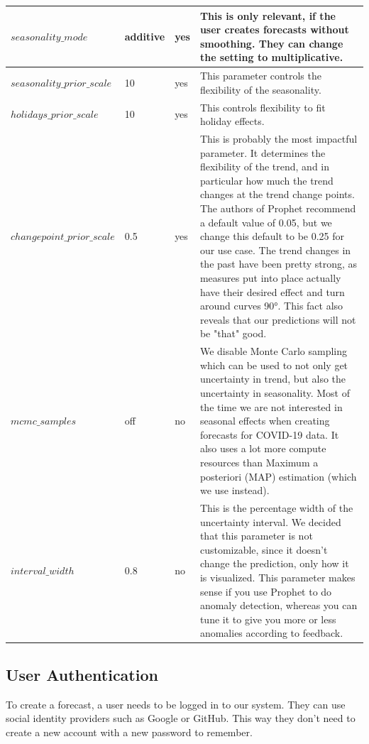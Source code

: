 \begin{table}
\begin{tabular}{|p{3.5cm}||p{1.6cm}|p{1.6cm}|p{9.6cm}|}
     \hline
     $seasonality\_mode$         & additive       & yes & This is only relevant, if the user creates forecasts without smoothing. They can change the setting to multiplicative. \\
     \hline
     $seasonality\_prior\_scale$ & 10             & yes & This parameter controls the flexibility of the seasonality. \\
     \hline
     $holidays\_prior\_scale$    & 10             & yes & This controls flexibility to fit holiday effects. \\
     \hline
     $changepoint\_prior\_scale$ & 0.5            & yes & This is probably the most impactful parameter. It determines the flexibility of the trend, and in particular how much the trend changes at the trend change points. The authors of Prophet recommend a default value of 0.05, but we change this default to be 0.25 for our use case. The trend changes in the past have been pretty strong, as measures put into place actually have their desired effect and turn around curves 90°. This fact also reveals that our predictions will not be "that" good. \\
     \hline
     $mcmc\_samples$             & off            & no  & We disable Monte Carlo sampling which can be used to not only get uncertainty in trend, but also the uncertainty in seasonality. Most of the time we are not interested in seasonal effects when creating forecasts for COVID-19 data. It also uses a lot more compute resources than Maximum a posteriori (MAP) estimation (which we use instead). \\
     \hline
     $interval\_width$           & 0.8            & no  & This is the percentage width of the uncertainty interval. We decided that this parameter is not customizable, since it doesn't change the prediction, only how it is visualized. This parameter makes sense if you use Prophet to do anomaly detection, whereas you can tune it to give you more or less anomalies according to feedback. \\
     \hline
  \end{tabular}
  \label{tab:hyper-params}
\end{table}

\subsection{User Authentication}
To create a forecast, a user needs to be logged in to our system. They can use social identity providers such as Google or GitHub. This way they don't need to create a new account with a new password to remember.

